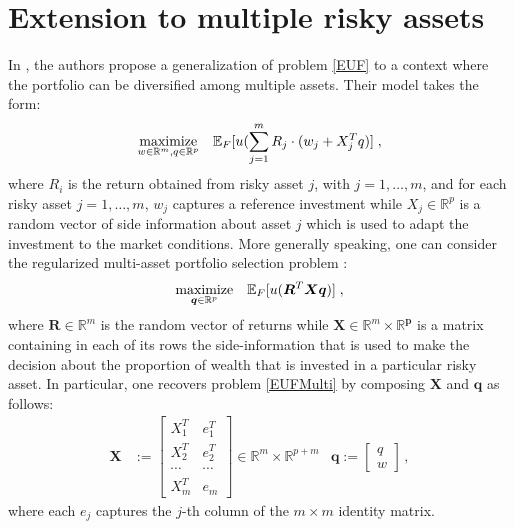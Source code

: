 \documentclass[]{interact}
\theoremstyle{plain}%
\theoremstyle{definition}
\theoremstyle{remark}
\def\Expect{{\mathbb E}}
\def\maximize{\mathop{\rm maximize}}
\newcommand{\0}{\V{0}}
\newcommand{\1}{\V{1}}
\renewcommand{\Re}{\mathbb{R}}
\newcommand{\modified}[1]{{\color{blue} #1}}
\def\CE{\mathop{\rm CE}}
\theoremstyle{plain}
\theoremstyle{definition}
\newtheorem*{ex}{Example}
\begin{document}




%
\section{\modified{Extension to multiple risky assets}}\label{sec:multiassets}
\newcommand{\vR}{{\boldsymbol{R}}}
\newcommand{\vr}{{\boldsymbol{r}}}
\newcommand{\vv}{{\boldsymbol{v}}}
\newcommand{\vSr}{{\mathcal{S}_\vr}}
\newcommand{\vSx}{{\mathcal{S}_\vx}}
\newcommand{\vX}{{\boldsymbol{X}}}
\newcommand{\vx}{{\boldsymbol{x}}}
\newcommand{\vq}{{\boldsymbol{q}}}
\newcommand{\vqhat}{{\hat{\boldsymbol{q}}}}
\newcommand{\vp}{{\boldsymbol{p}}}
\newcommand{\vOmegar}{{\boldsymbol{\Omega}}}


In \cite{brandt2009parametric}, the authors propose a generalization of problem \eqref{EUF} to a context where the portfolio can be diversified among multiple assets. Their model takes the form:
\begin{equation}
\maximize_{w\in\Re^m,q\in\Re^p}\;\;\;\Expect_\F[u(\sum_{j=1}^m R_j\cdot (w_j + X_j^T q)]\;,\label{EUFMulti}
\end{equation}
where $R_i$ is the return obtained from risky asset $j$, with $j=1,\dots,m$, and for each risky asset $j=1,\dots,m$, $w_j$ captures a reference investment while $X_j\in\Re^p$ is a random vector of side information about asset $j$ which is used to adapt the investment to the market conditions. More generally speaking, one can consider the regularized multi-asset portfolio selection problem :
\begin{equation}
\maximize_{\vq\in\Re^p}\;\;\;\Expect_\F[u(\vR^T \vX \vq)]\;,\label{EUFMultiGen}
\end{equation}
where $\vR\in\Re^m$ is the random vector of returns while $\vX\in\Re^m\times\Re^\vp$ is a matrix containing in each of its rows the side-information that is used to make the decision about the proportion of wealth that is invested in a particular risky asset. In particular, one recovers problem \eqref{EUFMulti} by composing $\vX$ and $\vq$ as follows:
\begin{align}\label{eq:BrandtModel}
\vX&:=\left[\begin{array}{cc}X_1^T & e_1^T\\ X_2^T & e_2^T\\ \cdots & \cdots\\ X_m^T & e_m\end{array}\right]\in\Re^m\times\Re^{p+m}& \vq:=\left[\begin{array}{c}q\\w\end{array}\right]\,,
\end{align}
where each $e_j$ captures the $j$-th column of the $m\times m$ identity matrix.
\end{document}
